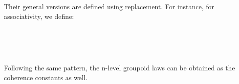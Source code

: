 \begin{code}
\\
%
\\
%
\\
%
\\
\> \AgdaSymbol{:}  \AgdaSymbol{\{}\AgdaSymbol{\}}\<%
\\
\>[0]\<[9]%
\>[9]\AgdaSymbol{(} \AgdaFunction{[} \AgdaSymbol{((} \AgdaInductiveConstructor{,} \AgdaSymbol{)} \AgdaInductiveConstructor{,}  \AgdaInductiveConstructor{,}  \AgdaInductiveConstructor{,} \AgdaSymbol{)} \AgdaInductiveConstructor{,}  \AgdaFunction{]tm}  \AgdaSymbol{)}\<%
\\
\> \AgdaSymbol{=}  \AgdaSymbol{(}  \AgdaSymbol{)}\<%
\\
%
\\
\> \AgdaSymbol{:}  \<%
\\
\> \AgdaSymbol{=}  \AgdaSymbol{(} \AgdaSymbol{(} \AgdaSymbol{(}  \AgdaSymbol{)} \AgdaSymbol{(} \AgdaSymbol{))} \AgdaSymbol{(} \AgdaSymbol{))}\<%
\\
\>\<\end{code}
\noindent Their general versions are defined using replacement. For instance, for associativity, we define:

\begin{code}\>\<%
\\
\> \<[14]%
\>[14]\AgdaSymbol{:} \AgdaSymbol{\}(} \AgdaSymbol{:}  \AgdaSymbol{)}   \AgdaSymbol{(}  \AgdaSymbol{)}\<%
\\
\>  \<[14]%
\>[14]\AgdaSymbol{=}    \<[37]%
\>[37]\<%
\\
\>\<\end{code}
Following the same pattern, the n-level groupoid laws can be obtained as the coherence constants as well.